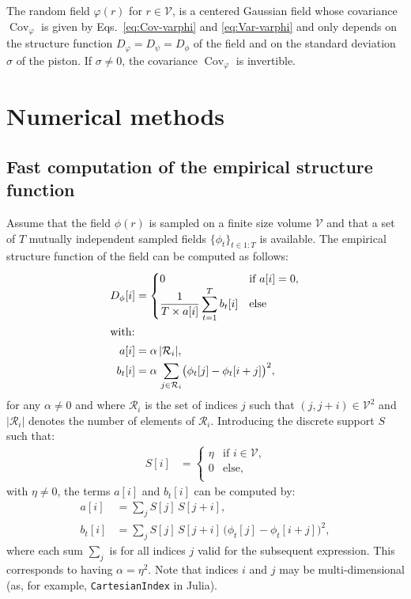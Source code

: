 \documentclass{article}
\DeclareMathOperator{\Cov}{Cov}
\begin{document}
The random field $\varphi(r)$ for $r \in \mathcal{V}$, is a centered Gaussian field whose
covariance $\Cov_{\varphi}$ is given by Eqs.~\eqref{eq:Cov-varphi} and
\eqref{eq:Var-varphi} and only depends on the structure function
$D_{\varphi} = D_{\psi} = D_{\phi}$ of the field and on the standard deviation $\sigma$ of
the piston. If $\sigma \not= 0$, the covariance $\Cov_{\varphi}$ is invertible.


\section{Numerical methods}

\subsection{Fast computation of the empirical structure function}

Assume that the field $\phi(r)$ is sampled on a finite size volume
$\mathcal{V}$ and that a set of $T$ mutually independent sampled fields
$\{\phi_{t}\}_{t \in 1:T}$ is available. The empirical structure function
of the field can be computed as follows:
\begin{align}
  D_{\phi}[i]
  &= \begin{cases}
       0 & \text{if $a[i] = 0$,}\\
       \displaystyle \frac{1}{T \times a[i]}
       \sum_{t=1}^{T} b_{t}[i] & \text{else}\\
     \end{cases}\\
  \intertext{with:}
  a[i] &= \alpha\,|\mathcal{R}_i|, \\
  b_{t}[i] &= \alpha\,\sum_{j \in \mathcal{R}_i}
             \bigl(\phi_{t}[j] - \phi_{t}[i+j]\bigr)^{2},
\end{align}
for any $\alpha \not= 0$ and where $\mathcal{R}_i$ is the set of indices $j$
such that $(j,j+i)\in\mathcal{V}^{2}$ and $|\mathcal{R}_i|$ denotes the number
of elements of $\mathcal{R}_i$. Introducing the discrete support $S$ such that:
\begin{align}
  S[i]
  &= \begin{cases}
       \eta & \text{if $i \in \mathcal{V}$,}\\
       0 & \text{else,}\\
     \end{cases}
\end{align}
with $\eta \not= 0$, the terms $a[i]$ and $b_{t}[i]$ can be computed by:
\begin{align}
  \label{eq:naive_a}
  a[i] &= \sum\nolimits_{j} S[j]\,S[j+i],\\
  \label{eq:naive_b}
  b_{t}[i] &= \sum\nolimits_{j} S[j]\,S[j+i]\,
             \bigl(\phi_{t}[j] - \phi_{t}[i+j]\bigr)^{2},
\end{align}
where each sum $\sum\nolimits_{j}$ is for all indices $j$ valid for the
subsequent expression. This corresponds to having $\alpha = \eta^{2}$.
Note that indices $i$ and $j$ may be multi-dimensional (as, for example,
\texttt{CartesianIndex} in Julia).
\end{document}
